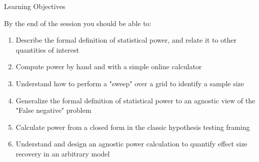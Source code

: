 \documentclass[
  ignorenonframetext,
  aspectratio=169,
]{beamer}
\begin{document}
\begin{frame}{Learning Objectives}
\label{learning-objectives}
\vspace{0.3em}

\small By the end of the session you should be able to:

\vspace{0.4em}

\begin{center}
\begin{enumerate}
  \item Describe the formal definition of statistical power, and relate it to other quantities of interest 
  \item Compute power by hand and with a simple online calculator
  \item Understand how to perform a "sweep" over a grid to identify a sample size 
  \item Generalize the formal definition of statistical power to an agnostic view of the "False negative" problem
  \item Calculate power from a closed form in the classic hypothesis testing framing 
  \item Understand and design an agnostic power calculation to quantify effect size recovery in an arbitrary model
\end{enumerate}
\end{center}
\end{frame}
\end{document}
